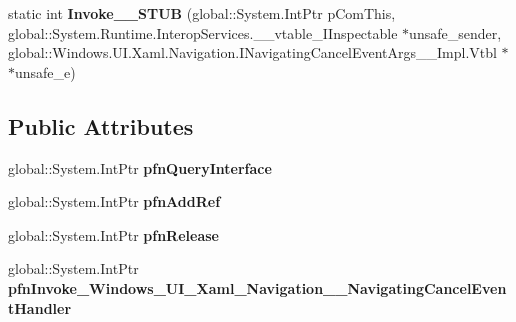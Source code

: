 \begin{DoxyCompactItemize}
\item 
\mbox{\label{struct_windows_1_1_u_i_1_1_xaml_1_1_navigation_1_1_navigating_cancel_event_handler_____impl_1_1_vtbl_a8330e0c5a30953c1360d72cd3972521c}} 
static int {\bfseries Invoke\+\_\+\+\_\+\+S\+T\+UB} (global\+::\+System.\+Int\+Ptr p\+Com\+This, global\+::\+System.\+Runtime.\+Interop\+Services.\+\_\+\+\_\+vtable\+\_\+\+I\+Inspectable $\ast$unsafe\+\_\+sender, global\+::\+Windows.\+U\+I.\+Xaml.\+Navigation.\+I\+Navigating\+Cancel\+Event\+Args\+\_\+\+\_\+\+Impl.\+Vtbl $\ast$$\ast$unsafe\+\_\+e)
\end{DoxyCompactItemize}
\subsection*{Public Attributes}
\begin{DoxyCompactItemize}
\item 
\mbox{\label{struct_windows_1_1_u_i_1_1_xaml_1_1_navigation_1_1_navigating_cancel_event_handler_____impl_1_1_vtbl_a6170e9924d7144dec403cd4c50934fe2}} 
global\+::\+System.\+Int\+Ptr {\bfseries pfn\+Query\+Interface}
\item 
\mbox{\label{struct_windows_1_1_u_i_1_1_xaml_1_1_navigation_1_1_navigating_cancel_event_handler_____impl_1_1_vtbl_aea0af7c7abea41974695b69b27f04df2}} 
global\+::\+System.\+Int\+Ptr {\bfseries pfn\+Add\+Ref}
\item 
\mbox{\label{struct_windows_1_1_u_i_1_1_xaml_1_1_navigation_1_1_navigating_cancel_event_handler_____impl_1_1_vtbl_a07bb8963d03fdb7ae95069648e47ff54}} 
global\+::\+System.\+Int\+Ptr {\bfseries pfn\+Release}
\item 
\mbox{\label{struct_windows_1_1_u_i_1_1_xaml_1_1_navigation_1_1_navigating_cancel_event_handler_____impl_1_1_vtbl_a0dd697c9aba41aefdff4bbd4bcb3262d}} 
global\+::\+System.\+Int\+Ptr {\bfseries pfn\+Invoke\+\_\+\+Windows\+\_\+\+U\+I\+\_\+\+Xaml\+\_\+\+Navigation\+\_\+\+\_\+\+Navigating\+Cancel\+Event\+Handler}
\end{DoxyCompactItemize}

